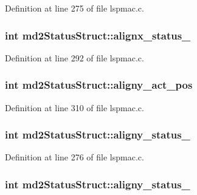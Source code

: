 Definition at line 275 of file lspmac.\-c.

\hypertarget{structmd2StatusStruct_a2feb35ceab8129fd2cc34d1104af8b8f}{
\subsubsection[{alignx\-\_\-status\-\_\-2}]{\setlength{\rightskip}{0pt plus 5cm}int md2\-Status\-Struct\-::alignx\-\_\-status\-\_}}\label{structmd2StatusStruct_a2feb35ceab8129fd2cc34d1104af8b8f}


Definition at line 292 of file lspmac.\-c.

\hypertarget{structmd2StatusStruct_a0d40a01d2aa93c443526e826440f77fc}{
\subsubsection[{aligny\-\_\-act\-\_\-pos}]{\setlength{\rightskip}{0pt plus 5cm}int md2\-Status\-Struct\-::aligny\-\_\-act\-\_\-pos}}\label{structmd2StatusStruct_a0d40a01d2aa93c443526e826440f77fc}


Definition at line 310 of file lspmac.\-c.

\hypertarget{structmd2StatusStruct_a2f2a11fe2fc7a446323def2be465185a}{
\subsubsection[{aligny\-\_\-status\-\_\-1}]{\setlength{\rightskip}{0pt plus 5cm}int md2\-Status\-Struct\-::aligny\-\_\-status\-\_}}\label{structmd2StatusStruct_a2f2a11fe2fc7a446323def2be465185a}


Definition at line 276 of file lspmac.\-c.

\hypertarget{structmd2StatusStruct_a1f98d8b9831e32d77129f9b0f1d7d255}{
\subsubsection[{aligny\-\_\-status\-\_\-2}]{\setlength{\rightskip}{0pt plus 5cm}int md2\-Status\-Struct\-::aligny\-\_\-status\-\_}}\label{structmd2StatusStruct_a1f98d8b9831e32d77129f9b0f1d7d255}


